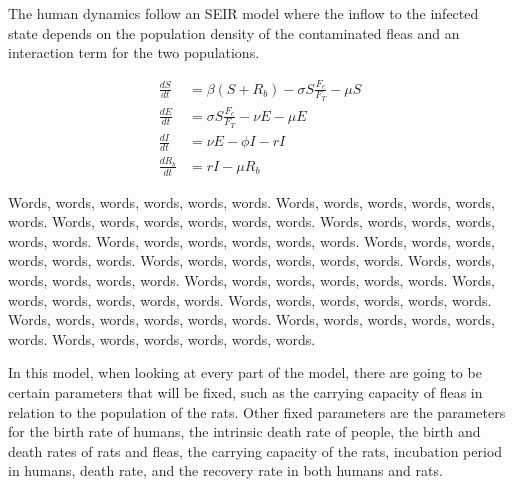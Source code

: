 \documentclass [letterpaper, 12pt] {article}
\begin{document}
The human dynamics follow an SEIR model where the inflow to the infected state depends on the
population density of the contaminated fleas and an interaction term for the two populations.

\begin{align}
	\frac{dS}{dt} &= \beta (S+R_b) - \sigma S \frac{F_c}{F_T} - \mu S \\
	\frac{dE}{dt} &= \sigma S \frac{F_c}{F_T} - \nu E - \mu E \\
	\frac{dI}{dt} &= \nu E - \phi I - rI \\
	\frac{dR_b}{dt} &= rI - \mu R_b
\end{align}

Words, words, words, words, words, words. Words, words, words, words, words, words. Words, words, words, words, words, words. Words, words, words, words, words, words. Words, words, words, words, words, words. Words, words, words, words, words, words. Words, words, words, words, words, words. Words, words, words, words, words, words. Words, words, words, words, words, words. Words, words, words, words, words, words. Words, words, words, words, words, words. Words, words, words, words, words, words. Words, words, words, words, words, words. Words, words, words, words, words, words. 



In this model, when looking at every part of the model, there are going to be certain parameters
that will be fixed, such as the carrying capacity of fleas in relation to the population of the rats.
Other fixed parameters are the parameters for the birth rate of humans, the intrinsic death rate of
people, the birth and death rates of rats and fleas, the carrying capacity of the rats, incubation period
in humans, death rate, and the recovery rate in both humans and rats.
\end{document}

